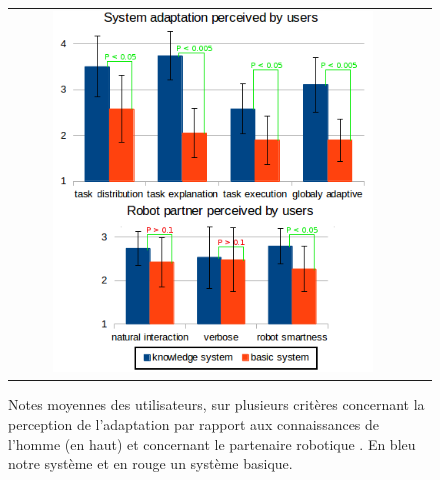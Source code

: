 \documentclass[a4paper,11pt,twoside]{StyleThese}
\begin{document}
 \begin{figure}[ht!]

 \centering
 \begin{tabular}{cc}
  \includegraphics[width=0.81\textwidth]{img/respvalue3.png}
 \end{tabular}
 \caption{Notes moyennes des utilisateurs, sur plusieurs critères concernant la perception de l'adaptation par rapport aux connaissances de l'homme (en haut) et concernant le partenaire robotique . En bleu notre système et en rouge un système basique.}
 \label{fig:results}
 \end{figure}
\end{document}
